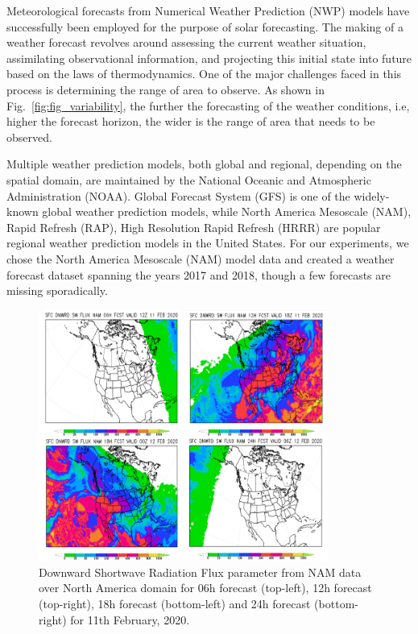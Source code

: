 Meteorological forecasts from Numerical Weather Prediction (NWP) models have successfully been employed for the purpose of solar forecasting. The making of a weather forecast revolves around assessing the current weather situation, assimilating observational information, and projecting this initial state into future based on the laws of thermodynamics. One of the major challenges faced in this process is determining the range of area to observe. As shown in Fig.~\ref{fig:fig_variability}, the further the forecasting of the weather conditions, i.e, higher the forecast horizon, the wider is the range of area that needs to be observed. 

\par Multiple weather prediction models, both global and regional, depending on the spatial domain, are maintained by the National Oceanic and Atmospheric Administration (NOAA). Global Forecast System (GFS) is one of the widely-known global weather prediction models, while North America Mesoscale (NAM), Rapid Refresh (RAP), High Resolution Rapid Refresh (HRRR) are popular regional weather prediction models in the United States. For our experiments, we chose the North America Mesoscale (NAM) model data and created a weather forecast dataset spanning the years 2017 and 2018, though a few forecasts are missing sporadically.

\begin{figure}[htbp]
    \begin{center}
    	\includegraphics[width=0.85\textwidth]{chapter3/fig_nam_dswrf.png}
    	\caption[Downward shortwave radiation flux parameter for 06h, 12h, 18h, 24h forecasts in a day for NAM model data]{Downward Shortwave Radiation Flux parameter from NAM data over North America domain for 06h forecast (top-left), 12h forecast (top-right), 18h forecast (bottom-left) and 24h forecast (bottom-right) for 11th February, 2020.}
    	\label{fig:fig_nam_dswrf}
    \end{center}
\end{figure}

